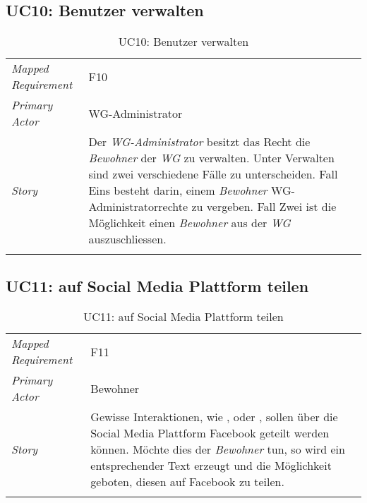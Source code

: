 \subsection{UC10: Benutzer verwalten}\label{subsec:uc10}
\begin{table}[H]
	\tablestyle
	\tablealtcolored
	\begin{tabularx}{\textwidth}{lX}
		\tablebody
			\textit{Mapped Requirement} &
			F10
			\tabularnewline
			\textit{Primary Actor} &
			WG-Administrator
			\tabularnewline
			\textit{Story} &
			Der \emph{WG-Administrator} besitzt das Recht die \emph{Bewohner} der \emph{WG} zu verwalten. Unter Verwalten sind zwei verschiedene Fälle zu unterscheiden. Fall Eins besteht darin, einem \emph{Bewohner} WG-Administratorrechte zu vergeben. Fall Zwei ist die Möglichkeit einen \emph{Bewohner} aus der \emph{WG} auszuschliessen.
			\tabularnewline
		\tableend
	\end{tabularx}
	\caption{UC10: Benutzer verwalten}
\end{table}


\subsection{UC11: auf Social Media Plattform teilen}\label{subsec:uc11}
\begin{table}[H]
	\tablestyle
	\tablealtcolored
	\begin{tabularx}{\textwidth}{lX}
		\tablebody
			\textit{Mapped Requirement} &
			F11
			\tabularnewline
			\textit{Primary Actor} &
			Bewohner
			\tabularnewline
			\textit{Story} &
			Gewisse Interaktionen, wie \nameref{subsec:uc3}, \nameref{subsec:uc7} oder \nameref{subsec:uc8}, sollen über die Social Media Plattform Facebook geteilt werden können. Möchte dies der \emph{Bewohner} tun, so wird ein entsprechender Text erzeugt und die Möglichkeit geboten, diesen auf Facebook zu teilen.
			\tabularnewline
		\tableend
	\end{tabularx}
	\caption{UC11: auf Social Media Plattform teilen}
\end{table}
